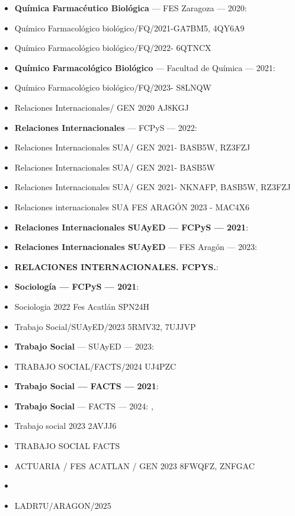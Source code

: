 \begin{itemize}[leftmargin=*]
  \item \textbf{Química Farmacéutico Biológica} --- FES Zaragoza --- 2020: 
  \item Químico Farmacológico biológico/FQ/2021-GA7BM5, 4QY6A9
  \item Químico Farmacológico biológico/FQ/2022- 6QTNCX
  \item \textbf{Químico Farmacológico Biológico} --- Facultad de Química --- 2021: 
  \item Químico Farmacológico biológico/FQ/2023- S8LNQW
  \item Relaciones Internacionales/ GEN 2020 AJ8KGJ
  \item \textbf{Relaciones Internacionales} --- FCPyS --- 2022: 
  \item Relaciones Internacionales SUA/ GEN 2021- BASB5W, RZ3FZJ
  \item Relaciones Internacionales SUA/ GEN 2021- BASB5W
  \item Relaciones Internacionales SUA/ GEN 2021- NKNAFP, BASB5W, RZ3FZJ
  \item Relaciones internacionales SUA FES ARAGÓN 2023 - MAC4X6
  \item \textbf{Relaciones Internacionales SUAyED --- FCPyS --- 2021}: 
  \item \textbf{Relaciones Internacionales SUAyED} --- FES Aragón --- 2023: 
  \item \textbf{RELACIONES INTERNACIONALES. FCPYS.}: 
  \item \textbf{Sociologí­a --- FCPyS --- 2021}: 
  \item Sociologia 2022 Fes Acatlán SPN24H
  \item Trabajo Social/SUAyED/2023 5RMV32, 7UJJVP
  \item \textbf{Trabajo Social} --- SUAyED --- 2023: 
  \item TRABAJO SOCIAL/FACTS/2024 UJ4PZC
  \item \textbf{Trabajo Social --- FACTS --- 2021}: 
  \item \textbf{Trabajo Social} --- FACTS --- 2024: , 
  \item Trabajo social 2023 2AVJJ6
  \item TRABAJO SOCIAL FACTS
  \item ACTUARIA / FES ACATLAN / GEN 2023 8FWQFZ, ZNFGAC
  \item {}
  \item LADR7U/ARAGON/2025

\end{itemize}
